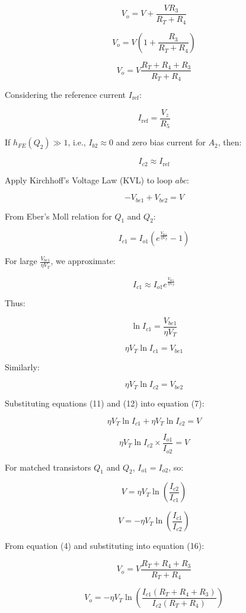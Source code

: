 \documentclass[a4paper,9pt,twoside,openany,twocolumn]{memoir}
\begin{document}
\[
V_o = V + \frac{V R_3}{R_T + R_4} \tag{2}
\]

\[
V_o = V \left( 1 + \frac{R_3}{R_T + R_4} \right) \tag{3}
\]

\[
V_o = V \frac{R_T + R_4 + R_3}{R_T + R_4} \tag{4}
\]

Considering the reference current \( I_{\text{ref}} \):

\[
I_{\text{ref}} = \frac{V_z}{R_5} \tag{5}
\]

If \( h_{FE}(Q_2) \gg 1 \), i.e., \( I_{b2} \approx 0 \) and zero bias current for \( A_2 \), then:

\[
I_{c2} \approx I_{\text{ref}} \tag{6}
\]

Apply Kirchhoff’s Voltage Law (KVL) to loop \( abc \):

\[
-V_{be1} + V_{be2} = V \tag{7}
\]

From Eber’s Moll relation for \( Q_1 \) and \( Q_2 \):

\[
I_{c1} = I_{o1} \left( e^{\frac{V_{be1}}{\eta V_T}} - 1 \right) \tag{8}
\]

For large \( \frac{V_{be1}}{\eta V_T} \), we approximate:

\[
I_{c1} \approx I_{o1} e^{\frac{V_{be1}}{\eta V_T}} \tag{9}
\]

Thus:

\[
\ln I_{c1} = \frac{V_{be1}}{\eta V_T} \tag{10}
\]

\[
\eta V_T \ln I_{c1} = V_{be1} \tag{11}
\]

Similarly:

\[
\eta V_T \ln I_{c2} = V_{be2} \tag{12}
\]

Substituting equations (11) and (12) into equation (7):

\[
\eta V_T \ln I_{c1} + \eta V_T \ln I_{c2} = V \tag{13}
\]

\[
\eta V_T \ln I_{c2} \times \frac{I_{o1}}{I_{o2}} = V \tag{14}
\]

For matched transistors \( Q_1 \) and \( Q_2 \), \( I_{o1} = I_{o2} \), so:

\[
V = \eta V_T \ln \left( \frac{I_{c2}}{I_{c1}} \right) \tag{15}
\]

\[
V = -\eta V_T \ln \left( \frac{I_{c1}}{I_{c2}} \right) \tag{16}
\]

From equation (4) and substituting into equation (16):

\[
V_o = V \frac{R_T + R_4 + R_3}{R_T + R_4} \tag{17}
\]

\[
V_o = -\eta V_T \ln \left( \frac{I_{c1} \left( R_T + R_4 + R_3 \right)}{I_{c2} \left( R_T + R_4 \right)} \right) \tag{18}
\]
\end{document}
